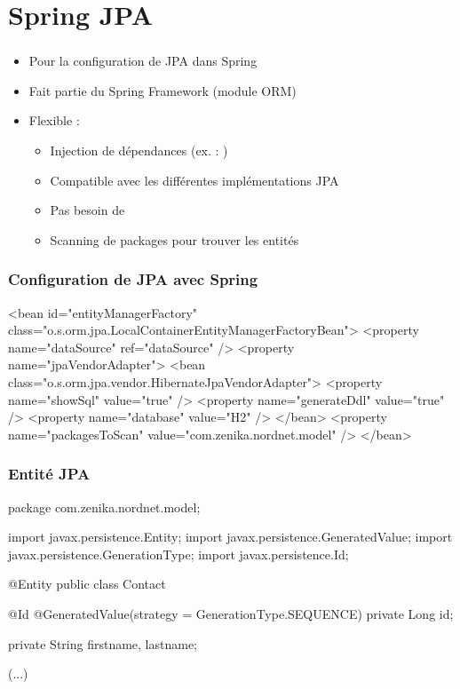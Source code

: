 \section{Spring JPA}



\begin{frame}
 \frametitle{}
 \begin{itemize}
  \item Pour la configuration de JPA dans Spring
  \item Fait partie du Spring Framework (module ORM)
  \item Flexible :
  \begin{itemize}  
    \item Injection de dépendances (ex. : )
    \item Compatible avec les différentes implémentations JPA
    \item Pas besoin de 
    \item Scanning de packages pour trouver les entités
  \end{itemize}
 \end{itemize}

\end{frame}


\begin{frame}[fragile]
 \frametitle{Configuration de JPA avec Spring}

 \begin{xmlcode}
<bean id="entityManagerFactory"
      class="o.s.orm.jpa.LocalContainerEntityManagerFactoryBean">
  <property name="dataSource" ref="dataSource" />
  <property name="jpaVendorAdapter">
  <bean class="o.s.orm.jpa.vendor.HibernateJpaVendorAdapter">
    <property name="showSql" value="true" />
    <property name="generateDdl" value="true" />
    <property name="database" value="H2" />
  </bean>
  <property name="packagesToScan" value="com.zenika.nordnet.model" />
</bean>
 \end{xmlcode}
\end{frame}

\begin{frame}[fragile]
 \frametitle{Entité JPA}

 \begin{javacode}
package com.zenika.nordnet.model;

import javax.persistence.Entity;
import javax.persistence.GeneratedValue;
import javax.persistence.GenerationType;
import javax.persistence.Id;

@Entity
public class Contact {

  @Id
  @GeneratedValue(strategy = GenerationType.SEQUENCE)
  private Long id;

  private String firstname, lastname;
  
  (...)
}
 \end{javacode}
\end{frame}

